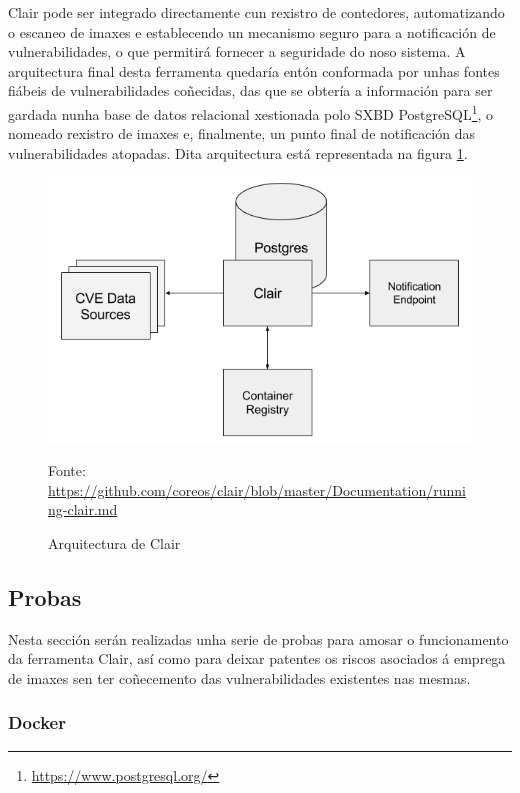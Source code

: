 Clair pode ser integrado directamente cun rexistro de contedores, automatizando o escaneo de imaxes e establecendo un mecanismo seguro para a notificación de vulnerabilidades, o que permitirá fornecer a seguridade do noso sistema. A arquitectura final desta ferramenta quedaría entón conformada por unhas fontes fiábeis de vulnerabilidades coñecidas, das que se obtería a información para ser gardada nunha base de datos relacional xestionada polo \gls{SXBD} PostgreSQL\footnote{\url{https://www.postgresql.org/}}, o nomeado rexistro de imaxes e, finalmente, un punto final de notificación das vulnerabilidades atopadas. Dita arquitectura está representada na figura \ref{clair-diagram}.

\begin{figure}
\centerline{\includegraphics[width=15cm]{figuras/clair-diagram.png}}
\caption{Arquitectura de Clair}
\small
\centerline{Fonte: \url{https://github.com/coreos/clair/blob/master/Documentation/running-clair.md}}
\label{clair-diagram}
\end{figure}

\subsection{Probas}

Nesta sección serán realizadas unha serie de probas para amosar o funcionamento da ferramenta Clair, así como para deixar patentes os riscos asociados á emprega de imaxes sen ter coñecemento das vulnerabilidades existentes nas mesmas.

\subsubsection{Docker}
\label{clairScannerDocker}

